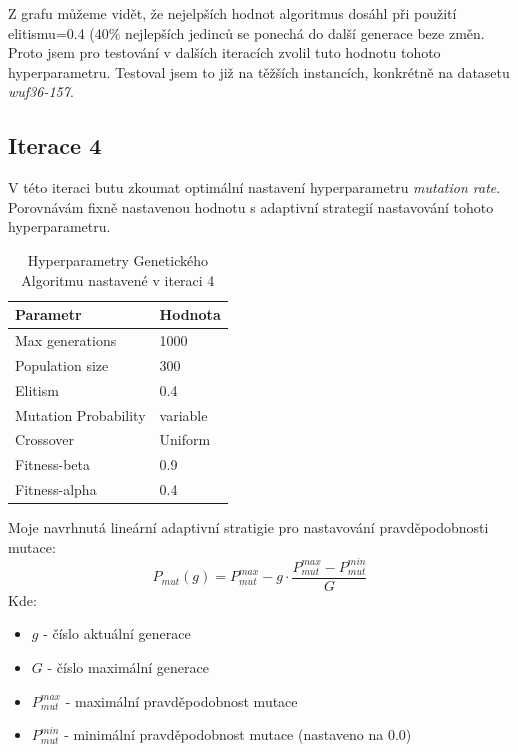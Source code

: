 \documentclass[12pt]{article}
\begin{document}
Z grafu můžeme vidět, že nejelpších hodnot algoritmus dosáhl při použití elitismu=0.4 (40\% nejlepších jedinců se ponechá do další generace beze změn. Proto jsem pro testování v dalších iteracích zvolil tuto hodnotu tohoto hyperparametru. Testoval jsem to již na těžších instancích, konkrétně na datasetu \textit{wuf36-157}. 
 

\subsection{Iterace 4}

V této iteraci butu zkoumat optimální nastavení hyperparametru \textit{mutation rate}. Porovnávám fixně nastavenou hodnotu s adaptivní strategií nastavování tohoto hyperparametru.

\begin{table}[H]
\centering
\caption{Hyperparametry Genetického Algoritmu nastavené v iteraci 4}
\begin{tabular}{@{}ll@{}}
\toprule
\textbf{Parametr}        & \textbf{Hodnota}       \\ \midrule
Max generations           & 1000                \\
Population size           & 300                 \\
Elitism                   & 0.4                 \\
Mutation Probability      & variable                 \\
Crossover                 & Uniform             \\
Fitness-beta              & 0.9            \\
Fitness-alpha             & 0.4                 \\ \bottomrule
\end{tabular}
\label{tab:ga_parameters}
\end{table}

Moje navrhnutá lineární adaptivní stratigie pro nastavování pravděpodobnosti mutace:
$$P_{mut}(g) = P_{mut}^{max} - g \cdot \frac{P_{mut}^{max} - P_{mut}^{min}}{G}$$
Kde:
\begin{itemize}
    \item $g$ - číslo aktuální generace
    \item $G$ - číslo maximální generace
    \item $P_{mut}^{max}$ - maximální pravděpodobnost mutace
    \item $P_{mut}^{min}$ - minimální pravděpodobnost mutace (nastaveno na 0.0)
\end{itemize}
\end{document}
